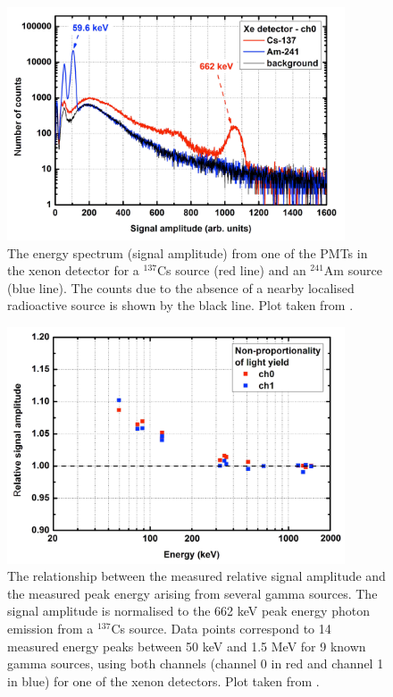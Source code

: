 \begin{figure}[htbp]
\begin{center}
\includegraphics[width=100mm]{Chapter8/figures/Cs-137_XenonResponse.pdf}
\caption{The energy spectrum (signal amplitude) from one of the PMTs in the xenon detector for a $^{137}$Cs source (red line) and an $^{241}$Am source (blue line). The counts due to the absence of a nearby localised radioactive source is shown by the black line. Plot taken from \cite{modesInternal}.}
\label{fig:modesCs137Response}
\end{center}
\end{figure}

\begin{figure}[htbp]
\begin{center}
\includegraphics[width=100mm]{Chapter8/figures/XenonNonLinearity.pdf}
\caption{The relationship between the measured relative signal amplitude and the measured peak energy arising from several gamma sources. The signal amplitude is normalised to the 662 keV peak energy photon emission from a $^{137}$Cs source. Data points correspond to 14 measured energy peaks between 50 keV and 1.5 MeV for 9 known gamma sources, using both channels (channel 0 in red and channel 1 in blue) for one of the xenon detectors. Plot taken from \cite{modesInternal}.}
\label{fig:modesXenonNoLinearity}
\end{center}
\end{figure}

